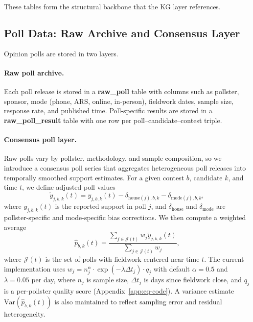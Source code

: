 \documentclass[11pt]{article}
\begin{document}
These tables form the structural backbone that the KG layer references.

\subsection{Poll Data: Raw Archive and Consensus Layer}

Opinion polls are stored in two layers.

\paragraph{Raw poll archive.} Each poll release is stored in a \textbf{raw\_poll} table with columns such as pollster, sponsor, mode (phone, ARS, online, in-person), fieldwork dates, sample size, response rate, and published time. Poll-specific results are stored in a \textbf{raw\_poll\_result} table with one row per poll--candidate--contest triple.

\paragraph{Consensus poll layer.} Raw polls vary by pollster, methodology, and sample composition, so we introduce a consensus poll series that aggregates heterogeneous poll releases into temporally smoothed support estimates. For a given contest $b$, candidate $k$, and time $t$, we define adjusted poll values
\begin{equation}
\tilde y_{j,b,k}(t) = y_{j,b,k}(t) - \delta_{\text{house}(j),b,k} - \delta_{\text{mode}(j),b,k},
\end{equation}
where $y_{j,b,k}(t)$ is the reported support in poll $j$, and $\delta_{\text{house}}$ and $\delta_{\text{mode}}$ are pollster-specific and mode-specific bias corrections. We then compute a weighted average
\begin{equation}
\hat p_{b,k}(t) = \frac{\sum_{j \in \mathcal{J}(t)} w_j \tilde y_{j,b,k}(t)}{\sum_{j \in \mathcal{J}(t)} w_j},
\end{equation}
where $\mathcal{J}(t)$ is the set of polls with fieldwork centered near time $t$. The current implementation uses $w_j = n_j^{\alpha} \cdot \exp(-\lambda \Delta t_j) \cdot q_j$ with default $\alpha = 0.5$ and $\lambda = 0.05$ per day, where $n_j$ is sample size, $\Delta t_j$ is days since fieldwork close, and $q_j$ is a per-pollster quality score (Appendix~\ref{app:eq-code}). A variance estimate $\mathrm{Var}(\hat p_{b,k}(t))$ is also maintained to reflect sampling error and residual heterogeneity.
\end{document}

